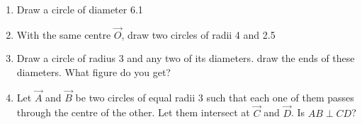 \renewcommand{\theequation}{\theenumi}
\begin{enumerate}[label=\arabic*.,ref=\thesubsection.\theenumi]

\item Draw a circle of diameter 6.1

\item With the same centre $\vec{O}$,  draw two circles of radii 4 and 2.5
\item Draw a circle of radius 3 and any two of its diameters.  draw the ends of these diameters. What figure do you get?
\item Let $\vec{A}$ and $\vec{B}$ be two circles of equal radii 3 such that each one of them passes through the centre of the other.  Let them intersect at $\vec{C}$ and $\vec{D}$.  Is $AB \perp CD$?


\end{enumerate}
